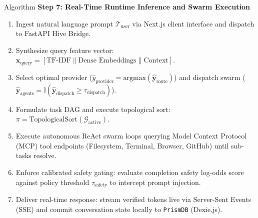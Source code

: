 \documentclass[aspectratio=169,10pt]{beamer}
\begin{document}
\begin{frame}[t]{Algorithm}
  \vspace{0.2em}
  {\large\bfseries\color{lavenderDark}Step 7: Real-Time Runtime Inference and Swarm Execution}
  \vspace{0.25em}
  \begin{enumerate}\setlength{\itemsep}{3pt}\small
    \item Ingest natural language prompt $\mathcal{T}_{\text{user}}$ via Next.js client interface and dispatch to FastAPI Hive Bridge.
    \item Synthesize query feature vector: $\mathbf{x}_{\text{query}} = [\text{TF-IDF} \parallel \text{Dense Embeddings} \parallel \text{Context}]$.
    \item Select optimal provider ($\hat{y}_{\text{provider}} = \mathrm{argmax}(\hat{\mathbf{y}}_{\text{route}})$) and dispatch swarm ($\hat{\mathbf{y}}_{\text{agents}} = \mathbb{I}(\hat{\mathbf{y}}_{\text{dispatch}} \ge \tau_{\text{dispatch}})$).
    \item Formulate task DAG and execute topological sort: $\pi = \mathrm{TopologicalSort}(\mathcal{G}_{\text{active}})$.
    \item Execute autonomous ReAct swarm loops querying Model Context Protocol (MCP) tool endpoints (Filesystem, Terminal, Browser, GitHub) until sub-tasks resolve.
    \item Enforce calibrated safety gating: evaluate completion safety log-odds score against policy threshold $\tau_{\text{safety}}$ to intercept prompt injection.
    \item Deliver real-time response: stream verified tokens live via Server-Sent Events (SSE) and commit conversation state locally to \texttt{PrismDB} (Dexie.js).
  \end{enumerate}
\end{frame}
\end{document}
